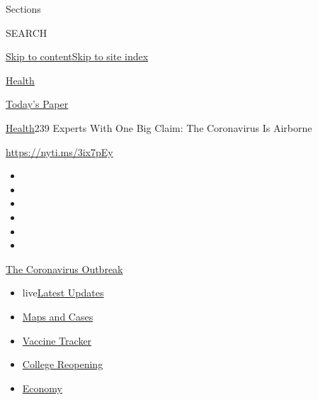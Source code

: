 Sections

SEARCH

\protect\hyperlink{site-content}{Skip to
content}\protect\hyperlink{site-index}{Skip to site index}

\href{https://www.nytimes.com/section/health}{Health}

\href{https://myaccount.nytimes.com/auth/login?response_type=cookie\&client_id=vi}{}

\href{https://www.nytimes.com/section/todayspaper}{Today's Paper}

\href{/section/health}{Health}\textbar{}239 Experts With One Big Claim:
The Coronavirus Is Airborne

\url{https://nyti.ms/3ix7pEy}

\begin{itemize}
\item
\item
\item
\item
\item
\item
\end{itemize}

\href{https://www.nytimes.com/news-event/coronavirus?action=click\&pgtype=Article\&state=default\&region=TOP_BANNER\&context=storylines_menu}{The
Coronavirus Outbreak}

\begin{itemize}
\tightlist
\item
  live\href{https://www.nytimes.com/2020/08/04/world/coronavirus-cases.html?action=click\&pgtype=Article\&state=default\&region=TOP_BANNER\&context=storylines_menu}{Latest
  Updates}
\item
  \href{https://www.nytimes.com/interactive/2020/us/coronavirus-us-cases.html?action=click\&pgtype=Article\&state=default\&region=TOP_BANNER\&context=storylines_menu}{Maps
  and Cases}
\item
  \href{https://www.nytimes.com/interactive/2020/science/coronavirus-vaccine-tracker.html?action=click\&pgtype=Article\&state=default\&region=TOP_BANNER\&context=storylines_menu}{Vaccine
  Tracker}
\item
  \href{https://www.nytimes.com/2020/08/02/us/covid-college-reopening.html?action=click\&pgtype=Article\&state=default\&region=TOP_BANNER\&context=storylines_menu}{College
  Reopening}
\item
  \href{https://www.nytimes.com/live/2020/08/04/business/stock-market-today-coronavirus?action=click\&pgtype=Article\&state=default\&region=TOP_BANNER\&context=storylines_menu}{Economy}
\end{itemize}


